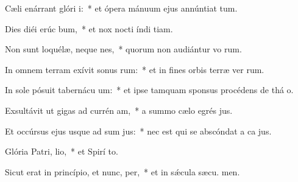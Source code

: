 \item Cæli enárrant glóri i:~* et ópera mánuum ejus annúntiat tum.
\item Dies diéi erúc bum,~* et nox nocti índi tiam.
\item Non sunt loquélæ, neque nes,~* quorum non audiántur vo rum.
\item In omnem terram exívit sonus rum:~* et in fines orbis terræ ver rum.
\item In sole pósuit tabernácu um:~* et ipse tamquam sponsus procédens de thá o.
\item Exsultávit ut gigas ad currén am,~* a summo cælo egrés jus.
\item Et occúrsus ejus usque ad sum jus:~* nec est qui se abscóndat a ca jus.
\item Glória Patri,  lio,~* et Spirí to.
\item Sicut erat in princípio, et nunc,  per,~* et in sǽcula sæcu. men.
